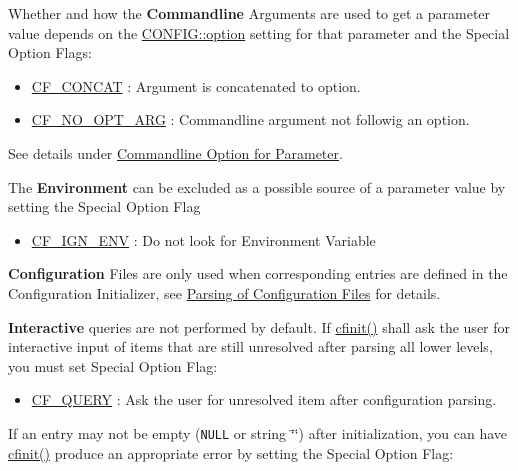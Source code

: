 Whether and how the {\bf Commandline} Arguments are used to get a parameter value depends on the \hyperlink{struct_c_o_n_f_i_g_60563bd93e85c1ddb8291a2d27a9c472}{CONFIG::option} setting for that parameter and the Special Option Flags:

\begin{itemize}
\item \hyperlink{group__special__options__mask_g9e526dae88bf6803772107ff283637b5}{CF\_\-CONCAT} : Argument is concatenated to option. \item \hyperlink{group__special__options__mask_g97d17b070dac10c14d3930c58bfba76f}{CF\_\-NO\_\-OPT\_\-ARG} : Commandline argument not followig an option. \end{itemize}


See details under \hyperlink{config_initializer_parameter_option}{Commandline Option for Parameter}.

The {\bf Environment} can be excluded as a possible source of a parameter value by setting the Special Option Flag

\begin{itemize}
\item \hyperlink{group__special__options__mask_g72b75851880f36aaa5a52fdfe7960cca}{CF\_\-IGN\_\-ENV} : Do not look for Environment Variable\end{itemize}


{\bf Configuration} Files are only used when corresponding entries are defined in the Configuration Initializer, see \hyperlink{config_levels_config_file_parsing}{Parsing of Configuration Files} for details.

{\bf Interactive} queries are not performed by default. If \hyperlink{group__cflib__core_ge593ff607f853bd5fc16a16bb6759314}{cfinit()} shall ask the user for interactive input of items that are still unresolved after parsing all lower levels, you must set Special Option Flag:

\begin{itemize}
\item \hyperlink{group__special__options__mask_ge39e0d9b4e9af8c6d4b3676783dd26e0}{CF\_\-QUERY} : Ask the user for unresolved item after configuration parsing. \end{itemize}


If an entry may not be empty ({\tt NULL} or string \char`\"{}\char`\"{}) after initialization, you can have \hyperlink{group__cflib__core_ge593ff607f853bd5fc16a16bb6759314}{cfinit()} produce an appropriate error by setting the Special Option Flag:

